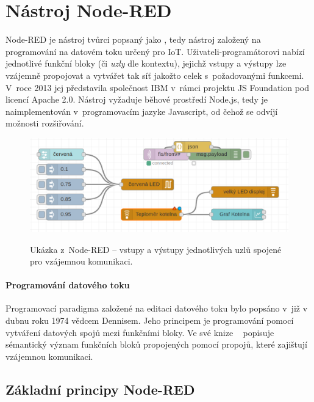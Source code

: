 \chapter{Nástroj Node-RED}
\label{ch:nastroj-node-red}

Node-RED je nástroj tvůrci popsaný jako , tedy nástroj založený na
programování na datovém toku určený pro IoT. Uživateli-programátorovi nabízí jednotlivé funkční bloky (či \emph{uzly} dle kontextu),
jejichž vstupy a výstupy lze vzájemně propojovat a vytvářet tak síť jakožto celek s~požadovanými funkcemi.
V~roce 2013 jej představila společnost IBM v~rámci projektu JS Foundation pod licencí Apache 2.0. Nástroj vyžaduje
běhové prostředí Node.js, tedy je naimplementován v~programovacím jazyke Javascript, od čehož se odvíjí možnosti
rozšiřování.

\begin{figure}
    \includegraphics[width=\textwidth]{figures/node-red-example.png}
    \label{fig:node-red-example}
    \caption{Ukázka z~Node-RED -- vstupy a výstupy jednotlivých uzlů spojené pro vzájemnou komunikaci.}
\end{figure}

\subsubsection{Programování datového toku}
Programovací paradigma založené na editaci datového toku bylo popsáno v~již v dubnu roku 1974 vědcem Dennisem. Jeho
principem je programování pomocí vytváření datových spojů mezi funkčními bloky.
Ve své knize ~\cite{FirstVersionOfDataflow} popisuje sémantický
význam funkčních bloků propojených pomocí propojů, které zajištují vzájemnou komunikaci. 

\section{Základní principy Node-RED}\label{sec:zakladni-principy-node-red}

